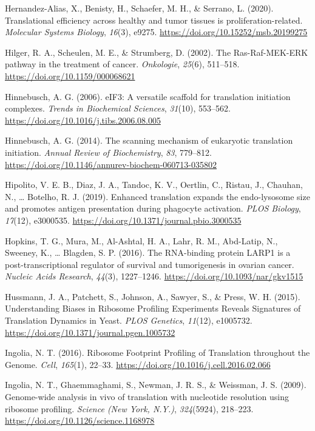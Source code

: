\documentclass[12pt,openany]{book}
\begin{document}
\hypertarget{ref-Hernandez-Alias2020}{}
Hernandez-Alias, X., Benisty, H., Schaefer, M. H., \& Serrano, L.
(2020). Translational efficiency across healthy and tumor tissues is
proliferation-related. \emph{Molecular Systems Biology}, \emph{16}(3),
e9275. \url{https://doi.org/10.15252/msb.20199275}

\hypertarget{ref-Hilger2002}{}
Hilger, R. A., Scheulen, M. E., \& Strumberg, D. (2002). The
Ras-Raf-MEK-ERK pathway in the treatment of cancer. \emph{Onkologie},
\emph{25}(6), 511--518. \url{https://doi.org/10.1159/000068621}

\hypertarget{ref-Hinnebusch2006}{}
Hinnebusch, A. G. (2006). eIF3: A versatile scaffold for translation
initiation complexes. \emph{Trends in Biochemical Sciences},
\emph{31}(10), 553--562.
\url{https://doi.org/10.1016/j.tibs.2006.08.005}

\hypertarget{ref-Hinnebusch2014}{}
Hinnebusch, A. G. (2014). The scanning mechanism of eukaryotic
translation initiation. \emph{Annual Review of Biochemistry}, \emph{83},
779--812. \url{https://doi.org/10.1146/annurev-biochem-060713-035802}

\hypertarget{ref-Hipolito2019}{}
Hipolito, V. E. B., Diaz, J. A., Tandoc, K. V., Oertlin, C., Ristau, J.,
Chauhan, N., \ldots{} Botelho, R. J. (2019). Enhanced translation
expands the endo-lysosome size and promotes antigen presentation during
phagocyte activation. \emph{PLOS Biology}, \emph{17}(12), e3000535.
\url{https://doi.org/10.1371/journal.pbio.3000535}

\hypertarget{ref-Hopkins2016}{}
Hopkins, T. G., Mura, M., Al-Ashtal, H. A., Lahr, R. M., Abd-Latip, N.,
Sweeney, K., \ldots{} Blagden, S. P. (2016). The RNA-binding protein
LARP1 is a post-transcriptional regulator of survival and tumorigenesis
in ovarian cancer. \emph{Nucleic Acids Research}, \emph{44}(3),
1227--1246. \url{https://doi.org/10.1093/nar/gkv1515}

\hypertarget{ref-Hussmann2015}{}
Hussmann, J. A., Patchett, S., Johnson, A., Sawyer, S., \& Press, W. H.
(2015). Understanding Biases in Ribosome Profiling Experiments Reveals
Signatures of Translation Dynamics in Yeast. \emph{PLOS Genetics},
\emph{11}(12), e1005732.
\url{https://doi.org/10.1371/journal.pgen.1005732}

\hypertarget{ref-Ingolia2016}{}
Ingolia, N. T. (2016). Ribosome Footprint Profiling of Translation
throughout the Genome. \emph{Cell}, \emph{165}(1), 22--33.
\url{https://doi.org/10.1016/j.cell.2016.02.066}

\hypertarget{ref-Ingolia2009}{}
Ingolia, N. T., Ghaemmaghami, S., Newman, J. R. S., \& Weissman, J. S.
(2009). Genome-wide analysis in vivo of translation with nucleotide
resolution using ribosome profiling. \emph{Science (New York, N.Y.)},
\emph{324}(5924), 218--223.
\url{https://doi.org/10.1126/science.1168978}
\end{document}
